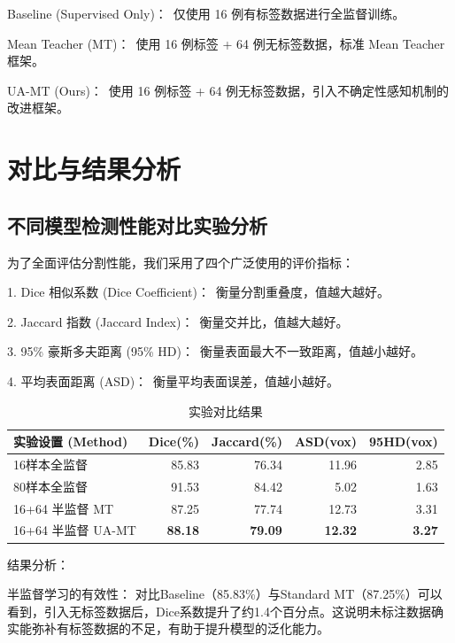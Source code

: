 \documentclass{xduugthesis}
\begin{document}
Baseline (Supervised Only)： 仅使用 16 例有标签数据进行全监督训练。

Mean Teacher (MT)： 使用 16 例标签 + 64 例无标签数据，标准 Mean Teacher 框架。

UA-MT (Ours)： 使用 16 例标签 + 64 例无标签数据，引入不确定性感知机制的改进框架。

\section{对比与结果分析}
\subsection{不同模型检测性能对比实验分析}
为了全面评估分割性能，我们采用了四个广泛使用的评价指标：

1. Dice 相似系数 (Dice Coefficient)： 衡量分割重叠度，值越大越好。

2. Jaccard 指数 (Jaccard Index)： 衡量交并比，值越大越好。

3. 95\% 豪斯多夫距离 (95\% HD)： 衡量表面最大不一致距离，值越小越好。

4. 平均表面距离 (ASD)： 衡量平均表面误差，值越小越好。

\begin{table}[htbp]
  \centering
  \caption{实验对比结果}
  \label{tab:exp_results_fullborder}
  
  \begin{tabular}{|l|r|r|r|r|}
    \hline 
    \textbf{实验设置 (Method)} & \textbf{Dice(\%)} & \textbf{Jaccard(\%)} & \textbf{ASD(vox)} & \textbf{95HD(vox)} \\
    \hline 
    16样本全监督 & 85.83 & 76.34 & 11.96 & 2.85 \\
    \hline 
    80样本全监督 & 91.53 & 84.42 & 5.02 & 1.63 \\
    \hline 
    16+64 半监督 MT & 87.25 & 77.74 & 12.73 & 3.31 \\
    \hline 
    16+64 半监督 UA-MT & \textbf{88.18} & \textbf{79.09} & \textbf{12.32} & \textbf{3.27} \\
    \hline 
  \end{tabular}
\end{table}

结果分析：

半监督学习的有效性： 对比Baseline（85.83\%）与Standard MT（87.25\%）可以看到，引入无标签数据后，Dice系数提升了约1.4个百分点。这说明未标注数据确实能弥补有标签数据的不足，有助于提升模型的泛化能力。
\end{document}
